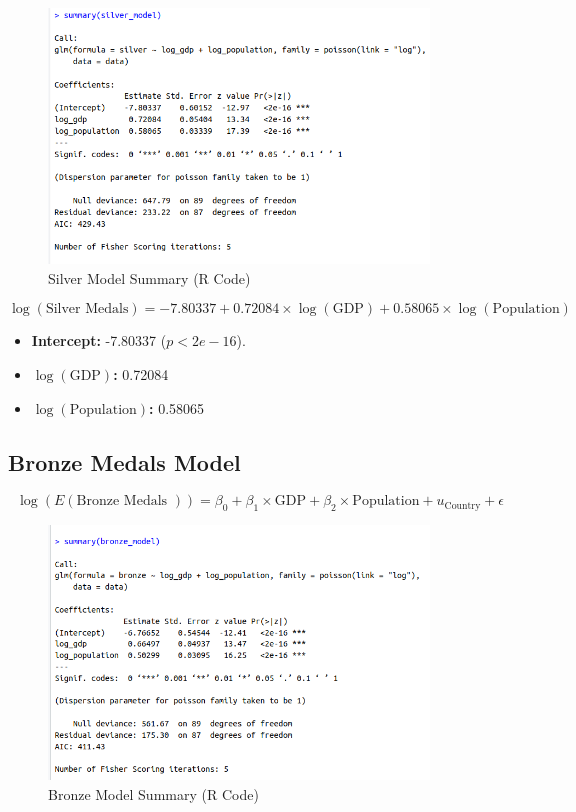 \documentclass[a4paper,12pt]{article}
\begin{document}
\begin{figure}[H]
	\centering
	\includegraphics[width=0.9\textwidth]{images/Silver_Model.png}
	\caption{Silver Model Summary (R Code)}
	\label{fig:dataset_fig_10}
\end{figure}


\[
\log(\text{Silver Medals}) = -7.80337 + 0.72084 \times \log(\text{GDP}) + 0.58065 \times \log(\text{Population})
\]
\begin{itemize}
	\item \textbf{Intercept:} -7.80337 (\(p < 2e-16\)).
	\item \textbf{\(\log(\text{GDP})\):} 0.72084 
	\item \textbf{\(\log(\text{Population})\):} 0.58065 
\end{itemize}

\subsection{Bronze Medals Model}


\[
\log(E(\text{Bronze Medals })) = \beta_0 + \beta_1 \times \text{GDP} + \beta_2 \times \text{Population} + u_{\text{Country}} + \epsilon
\]



\begin{figure}[H]
	\centering
	\includegraphics[width=0.9\textwidth]{images/Bronze_Model.png}
	\caption{Bronze Model Summary (R Code)}
	\label{fig:dataset_fig_10}
\end{figure}
\end{document}
